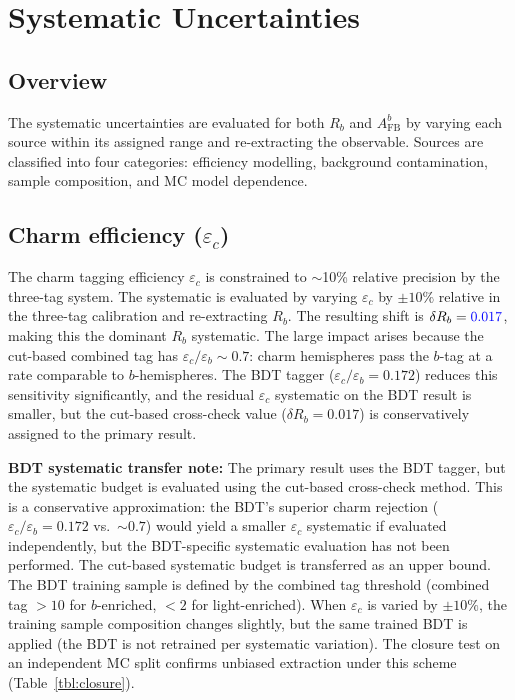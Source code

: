 \documentclass[11pt,a4paper]{article}
\newcommand{\measured}[1]{\textcolor{blue}{#1}}
\begin{document}
\section{Systematic Uncertainties}
\label{sec:systematics}

\subsection{Overview}

The systematic uncertainties are evaluated for both $R_b$ and
$A_\mathrm{FB}^b$ by varying each source within its assigned range and
re-extracting the observable.  Sources are classified into four
categories: efficiency modelling, background contamination, sample
composition, and MC model dependence.

\subsection{Charm efficiency ($\varepsilon_c$)}
\label{sec:syst-epsc}

The charm tagging efficiency $\varepsilon_c$ is constrained to $\sim$10\%
relative precision by the three-tag system.  The systematic is evaluated
by varying $\varepsilon_c$ by $\pm 10\%$ relative in the three-tag
calibration and re-extracting $R_b$.  The resulting shift is
$\delta R_b = \measured{0.017}$, making this the dominant $R_b$ systematic.
The large impact arises because the cut-based combined tag has
$\varepsilon_c / \varepsilon_b \sim 0.7$: charm hemispheres pass the
$b$-tag at a rate comparable to $b$-hemispheres.  The BDT tagger
($\varepsilon_c / \varepsilon_b = 0.172$) reduces this sensitivity
significantly, and the residual $\varepsilon_c$ systematic on the BDT
result is smaller, but the cut-based cross-check value ($\delta R_b = 0.017$)
is conservatively assigned to the primary result.

\textbf{BDT systematic transfer note:}
The primary result uses the BDT tagger, but the systematic budget is
evaluated using the cut-based cross-check method.  This is a conservative
approximation: the BDT's superior charm rejection
($\varepsilon_c/\varepsilon_b = 0.172$ vs.\ $\sim 0.7$) would yield a
smaller $\varepsilon_c$ systematic if evaluated independently, but the
BDT-specific systematic evaluation has not been performed.  The cut-based
systematic budget is transferred as an upper bound.  The BDT training
sample is defined by the combined tag threshold (combined tag $> 10$ for
$b$-enriched, $< 2$ for light-enriched).  When $\varepsilon_c$ is varied
by $\pm 10\%$, the training sample composition changes slightly, but the
same trained BDT is applied (the BDT is not retrained per systematic
variation).  The closure test on an independent MC split confirms unbiased
extraction under this scheme (Table~\ref{tbl:closure}).
\end{document}
